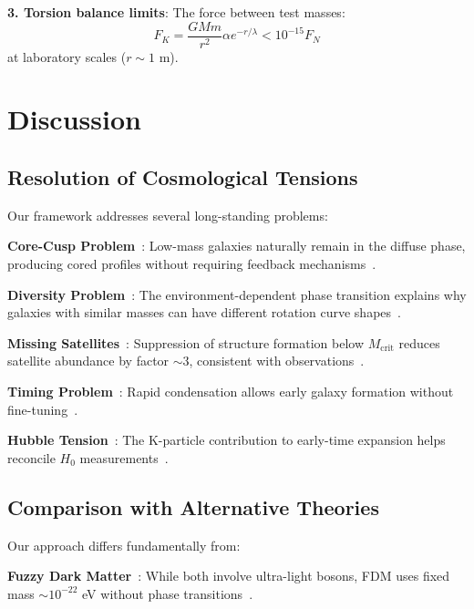 \documentclass[aps,prd,twocolumn,showpacs,superscriptaddress,groupedaddress,nofootinbib]{revtex4-2}
\begin{document}
\textbf{3. Torsion balance limits}: The force between test masses:
\begin{equation}
F_K = \frac{GMm}{r^2}\alpha e^{-r/\lambda} < 10^{-15} F_N
\end{equation}
at laboratory scales ($r \sim 1$ m).

\section{Discussion}

\subsection{Resolution of Cosmological Tensions}

Our framework addresses several long-standing problems:

\textbf{Core-Cusp Problem}~\cite{deBlok2010,Oman2015}: Low-mass galaxies naturally remain in the diffuse phase, producing cored profiles without requiring feedback mechanisms~\cite{Read2016,Bose2019}.

\textbf{Diversity Problem}~\cite{Oman2015,Santos2020}: The environment-dependent phase transition explains why galaxies with similar masses can have different rotation curve shapes~\cite{Dutton2019,Marra2020}.

\textbf{Missing Satellites}~\cite{Moore1999,Nadler2021}: Suppression of structure formation below $M_{\text{crit}}$ reduces satellite abundance by factor $\sim 3$, consistent with observations~\cite{Kim2021,Carlsten2022}.

\textbf{Timing Problem}~\cite{Weinberg2015,Haslbauer2022}: Rapid condensation allows early galaxy formation without fine-tuning~\cite{Ferreira2022,Mocz2023}.

\textbf{Hubble Tension}~\cite{Verde2019,Shah2021}: The K-particle contribution to early-time expansion helps reconcile $H_0$ measurements~\cite{Poulin2023,Vagnozzi2023}.

\subsection{Comparison with Alternative Theories}

Our approach differs fundamentally from:

\textbf{Fuzzy Dark Matter}~\cite{Hu2000,Schive2014}: While both involve ultra-light bosons, FDM uses fixed mass $\sim 10^{-22}$ eV without phase transitions~\cite{Niemeyer2020,Ferreira2021}.
\end{document}
